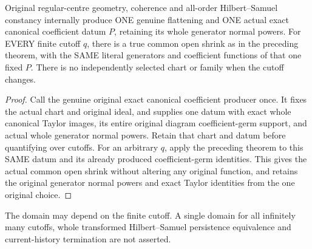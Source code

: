 \begin{theorem}
\label{hir:actual-original-hs-centre-finite-canonical-support-domains}
\leanok
Original regular-centre geometry, coherence and all-order Hilbert--Samuel
constancy internally produce ONE genuine flattening and ONE actual exact
canonical coefficient datum $P$, retaining its whole generator normal powers.
For EVERY finite cutoff $q$, there is a true common open shrink as in the
preceding theorem, with the SAME literal generators and coefficient functions
of that one fixed $P$. There is no independently selected chart or family
when the cutoff changes.
\end{theorem}
\begin{proof}
Call the genuine original exact canonical coefficient producer once. It fixes
the actual chart and original ideal, and supplies one datum with exact whole
canonical Taylor images, its entire original diagram coefficient-germ support,
and actual whole generator normal powers. Retain that chart and datum before
quantifying over cutoffs. For an arbitrary $q$, apply the preceding theorem
to this SAME datum and its already produced coefficient-germ identities.
This gives the actual common open shrink without altering any original
function, and retains the original generator normal powers and exact Taylor
identities from the one original choice.
\end{proof}

The domain may depend on the finite cutoff. A single domain for all infinitely
many cutoffs, whole transformed Hilbert--Samuel persistence equivalence and
current-history termination are not asserted.

